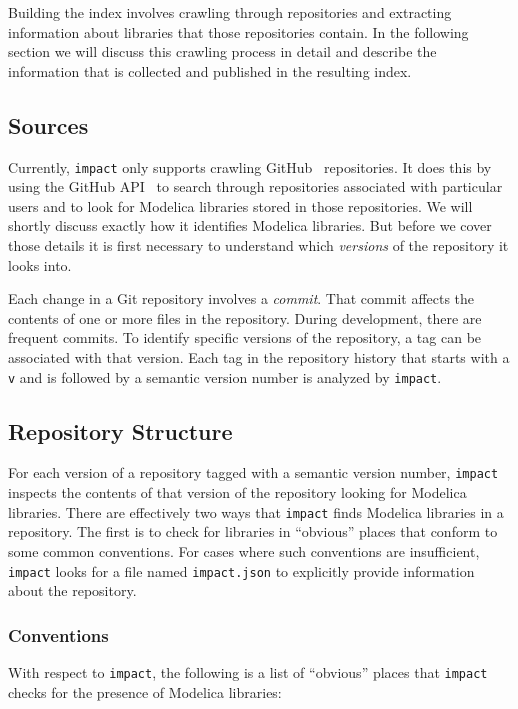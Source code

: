 \documentclass[11pt,a4paper,twocolumn]{article}
\newcommand{\code}[1]{\texttt{#1}} %
\begin{document}
Building the index involves crawling through repositories and
extracting information about libraries that those repositories
contain.  In the following section we will discuss this crawling
process in detail and describe the information that is collected and
published in the resulting index.

\subsection{Sources}

Currently, \code{impact} only supports crawling GitHub~\parencite{github}
repositories.  It does this by using the GitHub API~\parencite{gh-api} to
search through repositories associated with particular users and to
look for Modelica libraries stored in those repositories.  We will
shortly discuss exactly how it identifies Modelica libraries.  But
before we cover those details it is first necessary to understand
which \emph{versions} of the repository it looks into.

Each change in a Git repository involves a \emph{commit}.  That commit
affects the contents of one or more files in the repository.  During
development, there are frequent commits.  To identify specific
versions of the repository, a tag can be associated with that
version.  Each tag in the repository history that starts with a
\code{v} and is followed by a semantic version number is analyzed by
\code{impact}.

\subsection{Repository Structure}

For each version of a repository tagged with a semantic version
number, \code{impact} inspects the contents of that version of the
repository looking for Modelica libraries.  There are effectively two
ways that \code{impact} finds Modelica libraries in a repository.  The
first is to check for libraries in ``obvious'' places that conform to
some common conventions.  For cases where such conventions are
insufficient, \code{impact} looks for a file named \code{impact.json}
to explicitly provide information about the repository.

\subsubsection{Conventions}

With respect to \code{impact}, the following is a list of ``obvious''
places that \code{impact} checks for the presence of Modelica
libraries:
\end{document}
